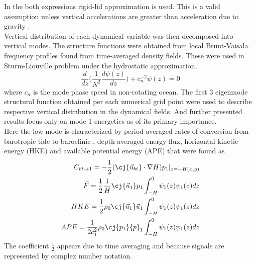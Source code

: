 \documentclass[12pt]{article}
\begin{document}
In the both expressions rigid-lid approximation is used. This is a valid assumption unless 
vertical accelerations are greater than acceleration due to gravity \citep{kelly2010}.\\
Vertical distribution of each dynamical variable was then decomposed into vertical modes. The 
structure functions were 
obtained from local Brunt-Vaisala frequency profiles found from time-averaged density fields. 
These were used in Sturm-Liouville problem under the hydrostatic approximation,
\begin{equation}
\frac{d}{dz}\Big( \frac{1}{N^2}  \frac{d \psi(z)}{dz}\Big) + c^{-2}_n \psi(z) 
= 0
\end{equation}
where $c_n$ is the mode phase speed in non-rotating ocean. The first 3 eigenmode structural 
function obtained per each numerical grid point were used to describe respective vertical 
distribution in the dynamical fields. And further presented results focus only on mode-1 energetics 
as of its primary importance.\\
Here the low mode is characterized by period-averaged rates of conversion from barotropic tide to 
baroclinic \citep{simmons2004internal, kurapov2003m}, depth-averaged energy flux, horizontal 
kinetic energy (HKE) and available potential energy (APE) that were found as
\begin{align}
\label{C3.eq:conv}
C_{bt\to 1} = -\frac{1}{2}(\cj{\vec{u}_{bt}} \cdot \nabla H) p_{1}|_{z = -H(x,y)}\\
\vec{F} = \frac{1}{2} \frac{1}{H} \cj{\vec{u}_1} p_1 \int_{-H}^{0} \psi_1(z) \psi_1(z) dz\\
HKE = \frac{1}{2} \rho_0 \cj{\vec{u}_1} \vec{u}_1 \int_{-H}^{0} \psi_1(z) \psi_1(z) dz\\
APE = \frac{1}{2c_1^2} \rho_0 \cj{p_1} {p}_1 \int_{-H}^{0} \psi_1(z) \psi_1(z) dz
\end{align}
The coefficient $\frac{1}{2}$ appears due to time averaging and because signals are represented by 
complex number notation.\\
\end{document}

